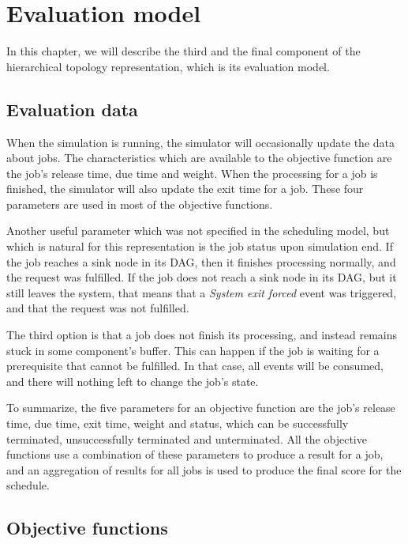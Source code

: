 \chapter{Evaluation model}
\label{sec:evaluation_model}

In this chapter, we will describe the third and the final component of the hierarchical topology representation, which is its evaluation model.

\section{Evaluation data}
\label{sec:evaluation_data}
When the simulation is running, the simulator will occasionally update the data about jobs. The characteristics which are available to the objective function are the job's release time, due time and weight. When the processing for a job is finished, the simulator will also update the exit time for a job. These four parameters are used in most of the objective functions.

Another useful parameter which was not specified in the scheduling model, but which is natural for this representation is the job status upon simulation end. If the job reaches a sink node in its DAG, then it finishes processing normally, and the request was fulfilled. If the job does not reach a sink node in its DAG, but it still leaves the system, that means that a \textit{System exit forced} event was triggered, and that the request was not fulfilled. 

The third option is that a job does not finish its processing, and instead remains stuck in some component's buffer. This can happen if the job is waiting for a prerequisite that cannot be fulfilled. In that case, all events will be consumed, and there will nothing left to change the job's state.

To summarize, the five parameters for an objective function are the job's release time, due time, exit time, weight and status, which can be successfully terminated, unsuccessfully terminated and unterminated. All the objective functions use a combination of these parameters to produce a result for a job, and an aggregation of results for all jobs is used to produce the final score for the schedule.

\section{Objective functions}
\label{sec:objective_functions}

